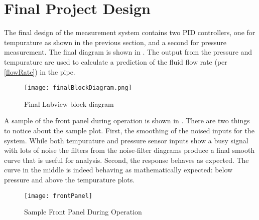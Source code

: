 \documentclass[main.tex]{subfile}
\begin{document}
\section{Final Project Design} 
\label{sec:final_project_design}

The final design of the measurement system contains two PID controllers, one for
tempurature as shown in the previous section, and a second for pressure
measurement. The final diagram is shown in . The output
from the pressure and tempurature are used to calculate a prediction of the
fluid flow rate (per \eqref{flowRate}) in the pipe.

\begin{figure}[h]
	\begin{center}
		\texttt{[image: finalBlockDiagram.png]}
	\end{center}
	\caption{Final Labview block diagram}
	\label{fig:finalDiagram}
\end{figure}

A sample of the front panel during operation is shown in .
There are two things to notice about the sample plot. First, the smoothing of
the noised inputs for the system. While both tempurature and pressure sensor
inputs show a busy signal with lots of noise the filters from the noise-filter
diagrams produce a final smooth curve that is useful for analysis. Second, the
response behaves as expected. The curve in the middle is indeed behaving as
mathematically expected: below pressure and above the tempurature plots.

\begin{figure}[h]
	\begin{center}
		\texttt{[image: frontPanel]}
	\end{center}
	\caption{Sample Front Panel During Operation}
	\label{fig:frontPanel}
\end{figure}

\end{document}
